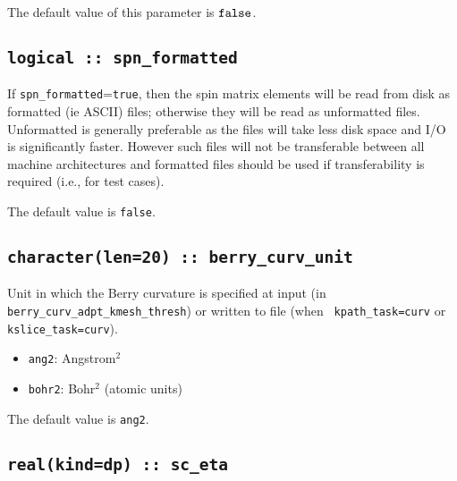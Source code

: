 The default value of this parameter is $\verb#false#$.




\subsection[spn\_formatted]{\tt logical :: spn\_formatted}

If \verb#spn_formatted#=\verb#true#, then the spin matrix elements
will be read from disk as formatted (ie ASCII) files; otherwise they
will be read as unformatted files. Unformatted is generally preferable
as the files will take less disk space and I/O is significantly
faster. However such files will not be transferable between all
machine architectures and formatted files should be used if
transferability is required (i.e., for test cases).

The default value is \verb#false#.


\subsection[spn\_formatted]{\tt character(len=20) :: berry\_curv\_unit}

Unit in which the Berry curvature is specified at input (in {\tt
  berry\_curv\_adpt\_kmesh\_thresh}) or written to file (when {\tt
  kpath\_task=curv} or {\tt kslice\_task=curv}).

\begin{itemize}

\item
  {\tt ang2}: Angstrom$^2$

\item
  {\tt bohr2}: Bohr$^2$ (atomic units)

\end{itemize}

The default value is {\tt ang2}.

\subsection{\tt real(kind=dp) :: sc\_eta}

